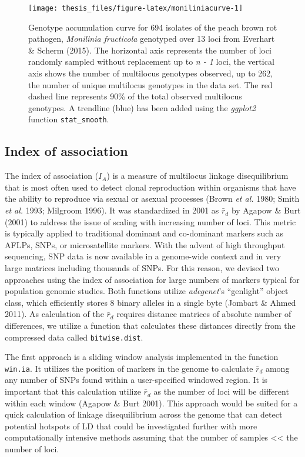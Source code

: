 \documentclass[double,12pt]{beavtex}
\begin{document}
  \begin{figure}
  
  {\centering \texttt{[image: thesis\_files/figure-latex/moniliniacurve-1]} 
  
  }
  
  \caption[Genotype accumulation curve]{Genotype accumulation curve for 694 isolates of the peach brown rot
  pathogen, \emph{Monilinia fructicola} genotyped over 13 loci from
  Everhart \& Scherm (2015). The horizontal axis represents the number of
  loci randomly sampled without replacement up to \emph{n - 1} loci, the
  vertical axis shows the number of multilocus genotypes observed, up to
  262, the number of unique multilocus genotypes in the data set. The red
  dashed line represents 90\% of the total observed multilocus genotypes.
  A trendline (blue) has been added using the \emph{ggplot2} function
  \texttt{stat\_smooth}.}\label{fig:moniliniacurve}
  \end{figure}
  
  \subsection{Index of association}\label{index-of-association-1}
  
  The index of association (\(I_A\)) is a measure of multilocus linkage
  disequilibrium that is most often used to detect clonal reproduction
  within organisms that have the ability to reproduce via sexual or
  asexual processes (Brown \emph{et al.} 1980; Smith \emph{et al.} 1993;
  Milgroom 1996). It was standardized in 2001 as \(\bar{r}_d\) by Agapow
  \& Burt (2001) to address the issue of scaling with increasing number of
  loci. This metric is typically applied to traditional dominant and
  co-dominant markers such as AFLPs, SNPs, or microsatellite markers. With
  the advent of high throughput sequencing, SNP data is now available in a
  genome-wide context and in very large matrices including thousands of
  SNPs. For this reason, we devised two approaches using the index of
  association for large numbers of markers typical for population genomic
  studies. Both functions utilize \emph{adegenet}'s ``genlight'' object
  class, which efficiently stores 8 binary alleles in a single byte
  (Jombart \& Ahmed 2011). As calculation of the \(\bar{r}_d\) requires
  distance matrices of absolute number of differences, we utilize a
  function that calculates these distances directly from the compressed
  data called \texttt{bitwise.dist}.
  
  The first approach is a sliding window analysis implemented in the
  function \texttt{win.ia}. It utilizes the position of markers in the
  genome to calculate \(\bar{r}_d\) among any number of SNPs found within
  a user-specified windowed region. It is important that this calculation
  utilize \(\bar{r}_d\) as the number of loci will be different within
  each window (Agapow \& Burt 2001). This approach would be suited for a
  quick calculation of linkage disequilibrium across the genome that can
  detect potential hotspots of LD that could be investigated further with
  more computationally intensive methods assuming that the number of
  samples \textless{}\textless{} the number of loci.
  
\end{document}
